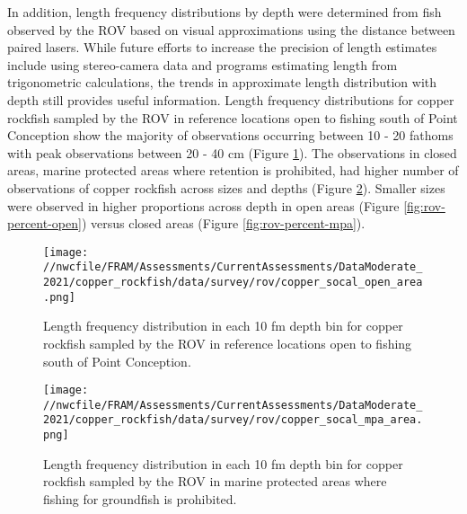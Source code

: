 \documentclass[11pt,
  english,
  a4paper,
]{article}
\begin{document}
In addition, length frequency distributions by depth were determined from fish observed by the ROV based on visual approximations using the distance between paired lasers. While future efforts to increase the precision of length estimates include using stereo-camera data and programs estimating length from trigonometric calculations, the trends in approximate length distribution with depth still provides useful information. Length frequency distributions for copper rockfish sampled by the ROV in reference locations open to fishing south of Point Conception show the majority of observations occurring between 10 - 20 fathoms with peak observations between 20 - 40 cm (Figure \ref{fig:rov-open}). The observations in closed areas, marine protected areas where retention is prohibited, had higher number of observations of copper rockfish across sizes and depths (Figure \ref{fig:rov-mpa}). Smaller sizes were observed in higher proportions across depth in open areas (Figure \ref{fig:rov-percent-open}) versus closed areas (Figure \ref{fig:rov-percent-mpa}).

\leavevmode\tagmcend\tagstructend\par


\begin{figure}
\centering
\texttt{[image: //nwcfile/FRAM/Assessments/CurrentAssessments/DataModerate\_2021/copper\_rockfish/data/survey/rov/copper\_socal\_open\_area.png]}
\caption{Length frequency distribution in each 10 fm depth bin for copper rockfish sampled by the ROV in reference locations open to fishing south of Point Conception.\label{fig:rov-open}}
\end{figure}

\tagmcend\tagstructend

\clearpage


\begin{figure}
\centering
\texttt{[image: //nwcfile/FRAM/Assessments/CurrentAssessments/DataModerate\_2021/copper\_rockfish/data/survey/rov/copper\_socal\_mpa\_area.png]}
\caption{Length frequency distribution in each 10 fm depth bin for copper rockfish sampled by the ROV in marine protected areas where fishing for groundfish is prohibited.\label{fig:rov-mpa}}
\end{figure}
\end{document}
